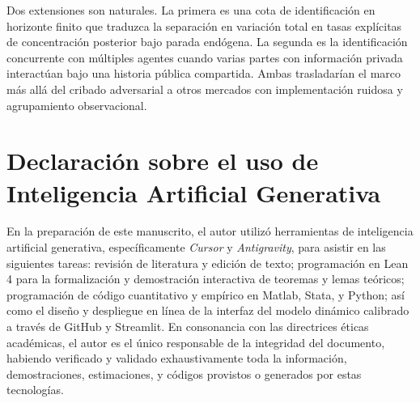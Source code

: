 \documentclass[review,authoryear,12pt]{elsarticle}
\theoremstyle{plain}
\theoremstyle{definition}
\newcommand{\1}{\mathbf{1}}
\begin{document}
Dos extensiones son naturales. La primera es una cota de identificación en horizonte finito que traduzca la separación en variación total en tasas explícitas de concentración posterior bajo parada endógena. La segunda es la identificación concurrente con múltiples agentes cuando varias partes con información privada interactúan bajo una historia pública compartida. Ambas trasladarían el marco más allá del cribado adversarial a otros mercados con implementación ruidosa y agrupamiento observacional.


\section*{Declaración sobre el uso de Inteligencia Artificial Generativa}

En la preparación de este manuscrito, el autor utilizó herramientas de inteligencia artificial generativa, específicamente \emph{Cursor} y \emph{Antigravity}, para asistir en las siguientes tareas: revisión de literatura y edición de texto; programación en Lean 4 para la formalización y demostración interactiva de teoremas y lemas teóricos; programación de código cuantitativo y empírico en Matlab, Stata, y Python; así como el diseño y despliegue en línea de la interfaz del modelo dinámico calibrado a través de GitHub y Streamlit. En consonancia con las directrices éticas académicas, el autor es el único responsable de la integridad del documento, habiendo verificado y validado exhaustivamente toda la información, demostraciones, estimaciones, y códigos provistos o generados por estas tecnologías.




\end{document}
